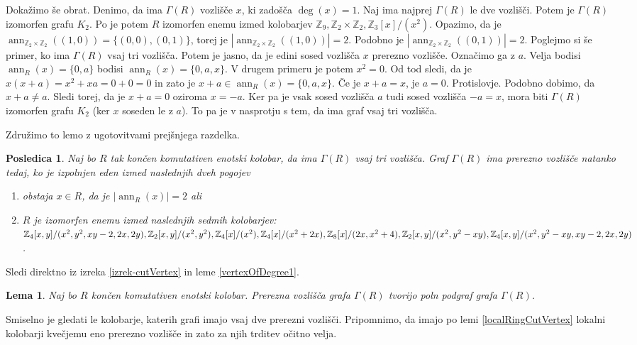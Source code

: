 \documentclass[a4paper, 12pt]{amsart}
\theoremstyle{definition} %
\theoremstyle{plain} %
\newtheorem{lema}[definicija]{Lema}
\newtheorem{posledica}[definicija]{Posledica}
\newcommand{\Z}{\mathbb Z}
\DeclareMathOperator{\ann}{ann}
\begin{document}
Dokažimo še obrat. Denimo, da ima $\Gamma(R)$ vozlišče $x$, ki zadošča $\deg(x)=1$. Naj ima najprej $\Gamma(R)$ le dve vozlišči. Potem je $\Gamma(R)$ izomorfen grafu $K_2$. Po \cite{Anderson-klasifikacijaMalihGrafov} je potem $R$ izomorfen enemu izmed kolobarjev $\Z_9, \Z_2 \times \Z_2, \Z_3[x]/(x^2)$. Opazimo, da je $\ann_{\Z_2 \times \Z_2}((1,0)) = \{(0,0), (0,1)\}$, torej je $|\ann_{\Z_2 \times \Z_2}((1,0))| = 2$. Podobno je $|\ann_{\Z_2 \times \Z_2}((0,1))| = 2$. 
Poglejmo si še primer, ko ima $\Gamma(R)$ vsaj tri vozlišča. Potem je jasno, da je edini sosed vozlišča $x$ prerezno vozlišče. Označimo ga z $a$. Velja bodisi $\ann_R(x) = \{0,a\}$ bodisi $\ann_R(x) = \{0,a,x\}$. V drugem primeru je potem $x^2 = 0$. Od tod sledi, da je $x(x+a) = x^2 + xa = 0 + 0 = 0$ in zato je $x+a \in \ann_R(x) = \{0,a,x\}$. Če je $x+a = x$, je $a=0$. Protislovje. Podobno dobimo, da $x+a\neq a$. Sledi torej, da je $x+a=0$ oziroma $x=-a$. Ker pa je vsak sosed vozlišča $a$ tudi sosed vozlišča $-a=x$, mora biti $\Gamma(R)$ izomorfen grafu $K_2$ (ker $x$ soseden le z $a$). To pa je v nasprotju s tem, da ima graf vsaj tri vozlišča.
\endproof

Združimo to lemo z ugotovitvami prejšnjega razdelka.

\begin{posledica}
Naj bo $R$ tak končen komutativen enotski kolobar, da ima $\Gamma(R)$ vsaj tri vozlišča. Graf $\Gamma(R)$ ima prerezno vozlišče natanko tedaj, ko je izpolnjen eden izmed naslednjih dveh pogojev
\begin{enumerate}
\item obstaja $x\in R$, da je $|\ann_R(x)| = 2$ ali
\item $R$ je izomorfen enemu izmed naslednjih sedmih kolobarjev: $\Z_4[x,y]/(x^2, y^2, \\xy-2,2x,2y), \Z_2[x,y]/(x^2,y^2), \Z_4[x]/(x^2),  \Z_4[x]/ (x^2+2x), \Z_8[x]/(2x,x^2 + 4), \Z_2[x,y]/(x^2, y^2 - xy), \Z_4[x,y]/(x^2, y^2 - xy, xy-2,2x,2y)$.
\end{enumerate}
\end{posledica}

\proof
Sledi direktno iz izreka \ref{izrek-cutVertex} in leme \ref{vertexOfDegree1}.
\endproof

\begin{lema}
Naj bo $R$ končen komutativen enotski kolobar. Prerezna vozlišča grafa $\Gamma(R)$ tvorijo poln podgraf grafa $\Gamma(R)$.
\end{lema}

\proof
Smiselno je gledati le kolobarje, katerih grafi imajo vsaj dve prerezni vozlišči. Pripomnimo, da imajo po lemi \ref{localRingCutVertex} lokalni kolobarji kvečjemu eno prerezno vozlišče in zato za njih trditev očitno velja.
\end{document}
